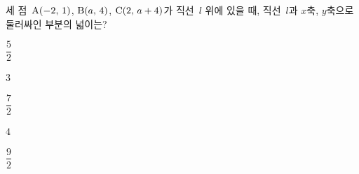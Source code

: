 세 점~$\mathrm{A}(-2,\mkern3mu 1)$, $\mathrm{B}(a,\mkern3mu 4)$, $\mathrm{C}(2,\mkern3mu a+4)$가 직선~$l$ 위에 있을 때, 직선~$l$과 $x$축, $y$축으로 둘러싸인 부분의 넓이는? 
\begin{choices32}{\rule[-3ex]{0pt}{8ex}$\dfrac{5}{2}$}{\rule[-3ex]{0pt}{8ex}$3$}{\rule[-3ex]{0pt}{8ex}$\dfrac{7}{2}$}{\rule[-3ex]{0pt}{8ex}$4$}{\rule[-3ex]{0pt}{8ex}$\dfrac{9}{2}$}\end{choices32}

